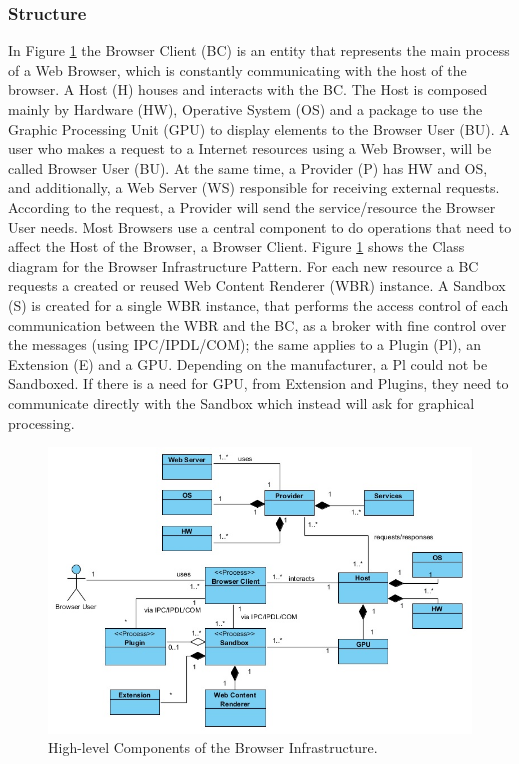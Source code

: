 \documentclass{sig-alternate-05-2015}
\begin{document}
    \subsubsection*{Structure}
    In Figure \ref{fig:BIPatt} the Browser Client (BC) is an entity that represents the main process of a Web Browser, which is constantly communicating with the host of the browser. A Host (H) houses and interacts with the BC. The Host is composed mainly by Hardware (HW), Operative System (OS) and a package to use the Graphic Processing Unit (GPU) to display elements to the Browser User (BU). A user who makes a request to a Internet resources using a Web Browser, will be called Browser User (BU). At the same time, a Provider (P) has HW and OS, and additionally, a Web Server (WS) responsible for receiving external requests. According to the request, a Provider will send the service/resource the Browser User needs. Most Browsers use a central component to do operations that need to affect the Host of the Browser, a Browser Client. Figure \ref{fig:BIPatt} shows the Class diagram for the Browser Infrastructure Pattern. For each new resource a BC requests a created or reused Web Content Renderer (WBR) instance. A Sandbox (S) is created for a single WBR instance, that performs the access control of each communication between the WBR and the BC, as a broker with fine control over the messages (using IPC/IPDL/COM); the same applies to a Plugin (Pl), an Extension (E) and a GPU. Depending on the manufacturer, a Pl could not be Sandboxed. If there is a need for GPU, from Extension and Plugins, they need to communicate directly with the Sandbox which instead will ask for graphical processing.

    \begin{figure}[h!t]
      \centering
      \includegraphics[scale=0.85]{figures/patron_v6.jpg}
      \caption{High-level Components of the Browser Infrastructure.}
      \label{fig:BIPatt}
    \end{figure}
\end{document}
